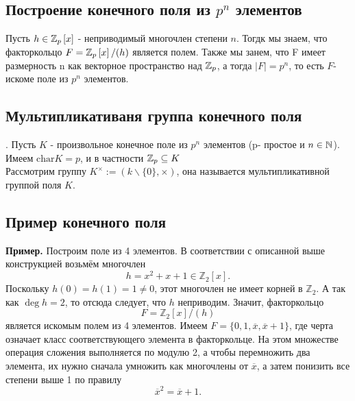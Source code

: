 \subsection{Построение конечного поля из $p^n$ элементов}
Пусть $h\in\mathbb{Z}_p\left[x\right]$ - неприводимый многочлен степени $n$. Тогдк мы знаем, что факторкольцо $F = \mathbb{Z}_p\left[x\right]/(h)$ является полем. Также мы занем, что F имеет размерность n как векторное пространство над $\mathbb{Z}_p$, а тогда $|F| = p^n$, то есть $F$- искоме поле из $p^n$ элементов. 
\subsection{Мультипликативаня группа конечного поля}.
Пусть $K$ - произвольное конечное поле из $p^n$ элементов (p- простое и $n\in\mathbb{N}$). Имеем $\text{char} K = p$, и в частности $\mathbb{Z}_p\subseteq K$\\
Рассмотрим группу $K^{\times} := (k\backslash\{0\}, \times)$, она называется мультипликативной группой поля $K$.
\subsection{Пример конечного поля}
\textbf{Пример.} Построим поле из 4 элементов. В соответствии с описанной выше конструкцией возьмём многочлен 
\[
h = x^2 + x + 1 \in \mathbb{Z}_2[x].
\]
Поскольку \( h(0) = h(1) = 1 \neq 0 \), этот многочлен не имеет корней в \(\mathbb{Z}_2\). А так как \(\deg h = 2\), то отсюда следует, что \( h \) неприводим. Значит, факторкольцо 
\[
F = \mathbb{Z}_2[x]/(h)
\]
является искомым полем из 4 элементов. Имеем \( F = \{0, 1, \overline{x}, \overline{x} + 1\} \), где черта означает класс соответствующего элемента в факторкольце. На этом множестве операция сложения выполняется по модулю 2, а чтобы перемножить два элемента, их нужно сначала умножить как многочлены от \(\overline{x}\), а затем понизить все степени выше 1 по правилу 
\[
\overline{x}^2 = \overline{x} + 1.
\]


